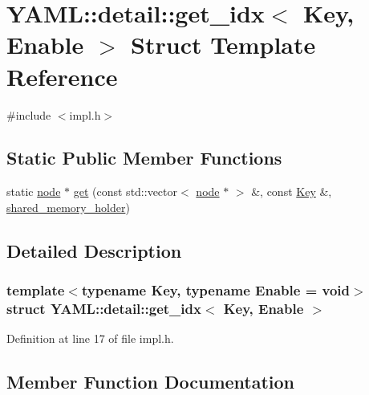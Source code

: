 \hypertarget{struct_y_a_m_l_1_1detail_1_1get__idx}{}\section{Y\+A\+ML\+::detail\+::get\+\_\+idx$<$ Key, Enable $>$ Struct Template Reference}
\label{struct_y_a_m_l_1_1detail_1_1get__idx}


{\ttfamily \#include $<$impl.\+h$>$}

\subsection*{Static Public Member Functions}
\begin{DoxyCompactItemize}
\item 
static \mbox{\hyperlink{class_y_a_m_l_1_1detail_1_1node}{node}} $\ast$ \mbox{\hyperlink{struct_y_a_m_l_1_1detail_1_1get__idx_a832c16135f3809afcd6e184251588216}{get}} (const std\+::vector$<$ \mbox{\hyperlink{class_y_a_m_l_1_1detail_1_1node}{node}} $\ast$ $>$ \&, const \mbox{\hyperlink{namespace_y_a_m_l_a67c320aa50d3de7ecba1d0b8775dd684a1af533fc24b0311b8c4d5ac2870283aa}{Key}} \&, \mbox{\hyperlink{namespace_y_a_m_l_1_1detail_a228c4b3b6ba1058b474d40afc218e21d}{shared\+\_\+memory\+\_\+holder}})
\end{DoxyCompactItemize}


\subsection{Detailed Description}
\subsubsection*{template$<$typename Key, typename Enable = void$>$\newline
struct Y\+A\+M\+L\+::detail\+::get\+\_\+idx$<$ Key, Enable $>$}



Definition at line 17 of file impl.\+h.



\subsection{Member Function Documentation}
\mbox{\label{struct_y_a_m_l_1_1detail_1_1get__idx_a832c16135f3809afcd6e184251588216}} 
